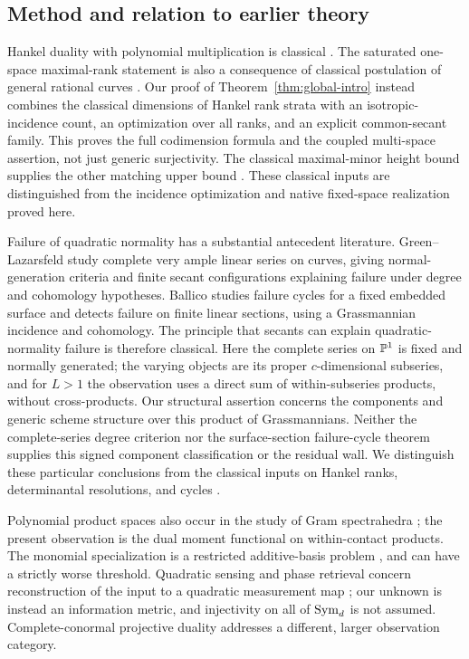 \subsection*{Method and relation to earlier theory}
Hankel duality with polynomial multiplication is classical \cite{MP}. The saturated one-space maximal-rank statement is also a consequence of classical postulation of general rational curves \cite{BE85,BE87,Larson}. Our proof of Theorem~\ref{thm:global-intro} instead combines the classical dimensions of Hankel rank strata \cite[Sections 1--2]{CMSV} with an isotropic-incidence count, an optimization over all ranks, and an explicit common-secant family. This proves the full codimension formula and the coupled multi-space assertion, not just generic surjectivity. The classical maximal-minor height bound supplies the other matching upper bound \cite[Introduction]{EHU}. These classical inputs are distinguished from the incidence optimization and native fixed-space realization proved here.

Failure of quadratic normality has a substantial antecedent literature. Green--Lazarsfeld \cite[Theorems 1 and 3]{GL86} study complete very ample linear series on curves, giving normal-generation criteria and finite secant configurations explaining failure under degree and cohomology hypotheses. Ballico \cite[Theorem 0.2]{Ballico96} studies failure cycles for a fixed embedded surface and detects failure on finite linear sections, using a Grassmannian incidence and cohomology. The principle that secants can explain quadratic-normality failure is therefore classical. Here the complete series on $\mathbb P^1$ is fixed and normally generated; the varying objects are its proper $c$-dimensional subseries, and for $L>1$ the observation uses a direct sum of within-subseries products, without cross-products. Our structural assertion concerns the components and generic scheme structure over this product of Grassmannians. Neither the complete-series degree criterion nor the surface-section failure-cycle theorem supplies this signed component classification or the residual wall. We distinguish these particular conclusions from the classical inputs on Hankel ranks, determinantal resolutions, and cycles \cite{CMSV,EN,Kustin,KL,Fulton}.

Polynomial product spaces also occur in the study of Gram spectrahedra \cite{Sch}; the present observation is the dual moment functional on within-contact products. The monomial specialization is a restricted additive-basis problem \cite{Yu,Kohonen14,Kohonen17}, and can have a strictly worse threshold. Quadratic sensing and phase retrieval concern reconstruction of the input to a quadratic measurement map \cite{BCE}; our unknown is instead an information metric, and injectivity on all of $\operatorname{Sym}_d$ is not assumed. Complete-conormal projective duality \cite{GKZ} addresses a different, larger observation category.

